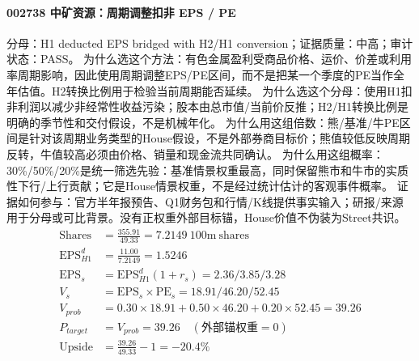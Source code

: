 \paragraph{002738 中矿资源：周期调整扣非 EPS / PE}
分母：H1 deducted EPS bridged with H2/H1 conversion；证据质量：中高；审计状态：PASS。
为什么选这个方法：有色金属盈利受商品价格、运价、价差或利用率周期影响，因此使用周期调整EPS/PE区间，而不是把某一个季度的PE当作全年估值。H2转换比例用于检验当前周期能否延续。
为什么选这个分母：使用H1扣非利润以减少非经常性收益污染；股本由总市值/当前价反推；H2/H1转换比例是明确的季节性和交付假设，不是机械年化。
为什么用这组倍数：熊/基准/牛PE区间是针对该周期业务类型的House假设，不是外部券商目标价；熊值较低反映周期反转，牛值较高必须由价格、销量和现金流共同确认。
为什么用这组概率：30\%/50\%/20\%是统一筛选先验：基准情景权重最高，同时保留熊市和牛市的实质性下行/上行贡献；它是House情景权重，不是经过统计估计的客观事件概率。
证据如何参与：官方半年报预告、Q1财务包和行情/K线提供事实输入；研报/来源用于分母或可比背景。没有正权重外部目标锚，House价值不伪装为Street共识。
\begin{align*}
\mathrm{Shares} &= \frac{355.91}{49.33}=7.2149\ \mathrm{100m\ shares}\\
\mathrm{EPS}_{H1}^d &= \frac{11.00}{7.2149}=1.5246\\
\mathrm{EPS}_s &= \mathrm{EPS}_{H1}^d(1+r_s)=2.36/3.85/3.28\\
V_s &= \mathrm{EPS}_s\times \mathrm{PE}_s=18.91/46.20/52.45\\
V_{prob} &= 0.30\times 18.91+0.50\times 46.20+0.20\times 52.45=39.26\\
P_{target} &= V_{prob}=39.26\quad(\text{外部锚权重}=0)\\
\mathrm{Upside} &= \frac{39.26}{49.33}-1=-20.4\%\\
\end{align*}

